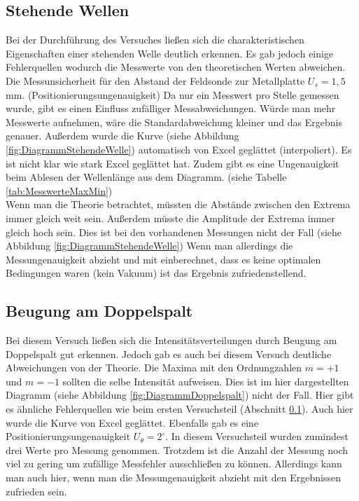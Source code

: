 \documentclass[a4paper]{scrartcl}
\numberwithin{equation}{subsection}
\begin{document}
\subsection{Stehende Wellen}
\label{sec:fazitStehendeWellen}
Bei der Durchführung des Versuches ließen sich die charakteristischen Eigenschaften einer stehenden Welle deutlich erkennen. Es gab jedoch einige Fehlerquellen wodurch die Messwerte von den theoretischen Werten abweichen. Die Messunsicherheit für den Abstand der Feldsonde zur Metallplatte $U_s = 1,5$ mm. (Positionierungsungenauigkeit)
Da nur ein Messwert pro Stelle gemessen wurde, gibt es einen Einfluss zufälliger Messabweichungen. Würde man mehr Messwerte aufnehmen, wäre die Standardabweichung kleiner und das Ergebnis genauer.
Außerdem wurde die Kurve (siehe Abbildung \ref{fig:DiagrammStehendeWelle}) automatisch von Excel geglättet (interpoliert). Es ist nicht klar wie stark Excel geglättet hat.
Zudem gibt es eine Ungenauigkeit beim Ablesen der Wellenlänge aus dem Diagramm.
(siehe Tabelle \ref{tab:MesswerteMaxMin})\\
Wenn man die Theorie betrachtet, müssten die Abstände zwischen den Extrema immer gleich weit sein. Außerdem müsste die Amplitude der Extrema immer gleich hoch sein. Dies ist bei den vorhandenen Messungen nicht der Fall (siehe Abbildung \ref{fig:DiagrammStehendeWelle})
Wenn man allerdings die Messungenauigkeit abzieht und mit einberechnet, dass es keine optimalen Bedingungen waren (kein Vakuum) ist das Ergebnis zufriedenstellend.

\subsection{Beugung am Doppelspalt}
Bei diesem Versuch ließen sich die Intensitätsverteilungen durch Beugung am Doppelspalt gut erkennen. Jedoch gab es auch bei diesem Versuch deutliche Abweichungen von der Theorie. Die Maxima mit den Ordnungzahlen $m = +1$ und $m = -1$ sollten die selbe Intensität aufweisen. Dies ist im hier dargestellten Diagramm (siehe Abbildung \ref{fig:DiagrammDoppelspalt}) nicht der Fall. Hier gibt es ähnliche Fehlerquellen wie beim ersten Versuchsteil (Abschnitt \ref{sec:fazitStehendeWellen}). Auch hier wurde die Kurve von Excel geglättet. Ebenfalls gab es eine Positionierungsungenauigkeit $U_{\theta} = 2 ^\circ$. In diesem Versuchsteil wurden zumindest drei Werte pro Messung genommen. Trotzdem ist die Anzahl der Messung noch viel zu gering um zufällige Messfehler ausschließen zu können.
Allerdings kann man auch hier, wenn man die Messungenauigkeit abzieht mit den Ergebnissen zufrieden sein.
\end{document}
